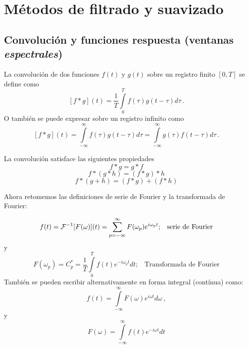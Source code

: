 \documentclass[
]{agujournal2019}
\begin{document}
\section{Métodos de filtrado y suavizado}
\subsection{Convolución y funciones respuesta (ventanas {\it espectrales})}

La convolución de dos funciones \(f(t)\) y \(g(t)\) sobre un registro
finito \([0,T]\) se define como
\[[f*g](t)=\frac{1}{T}\int\limits^{T}_{0}f(\tau)g(t-\tau) d\tau\,.\] O
también se puede expresar sobre un registro infinito como
\[[f*g](t)=\int\limits^{\infty}_{-\infty}f(\tau)g(t-\tau) d\tau = \int\limits^{\infty}_{-\infty}g(\tau)f(t-\tau) d\tau\,.\]

La convolución satisface las siguientes propiedades \[f*g=g*f\]
\[f*(g*h)=(f*g)*h\] \[f*(g+h)=(f*g)+(f*h)\]

Ahora retomemos las definiciones de serie de Fourier y la transformada
de Fourier:

\begin{framed}
$$f(t)={\cal F}^{-1}[F(\omega)](t)=\sum\limits^{\infty}_{p=-\infty} F(\omega_p) e^{i\omega_p t};\,\,\,\,\,\text{serie de Fourier}$$
y
$$F(\omega_p)=C^*_p=\frac{1}{T}\int\limits^{T}_{0}f(t)e^{-i\omega_p t} dt;\,\,\,\,\,\text{Transformada de Fourier}$$
También se pueden escribir alternativamente en forma integral (contínua) como:
$$f(t)=\int\limits^{\infty}_{-\infty} F(\omega) e^{i\omega t} d\omega\,,$$
y
$$F(\omega)=\int\limits^{\infty}_{-\infty}f(t)e^{-i\omega t} dt$$

\end{framed}
\end{document}
